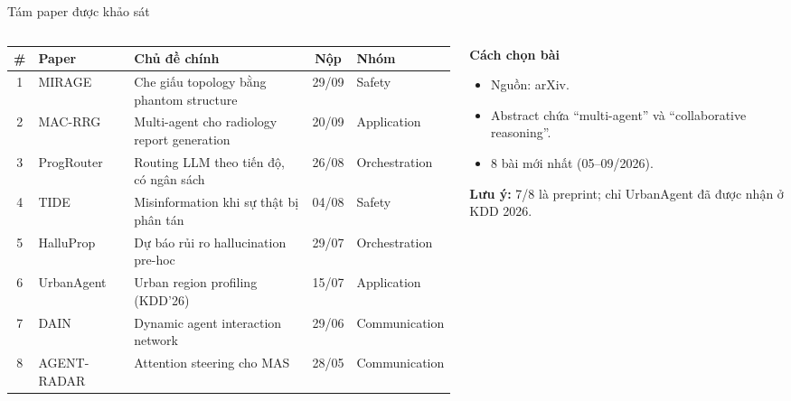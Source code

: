 \documentclass[aspectratio=169,10pt]{beamer}
\begin{document}
\begin{frame}{Tám paper được khảo sát}
  \begin{columns}[T]
    \begin{column}{0.68\textwidth}
      \scriptsize
      \begin{tabular}{@{}c l >{\raggedright\arraybackslash}p{2.9cm} c l@{}}
        \toprule
        \# & Paper & Chủ đề chính & Nộp & Nhóm \\
        \midrule
        1 & MIRAGE      & Che giấu topology bằng phantom structure    & 29/09 & Safety \\
        2 & MAC-RRG     & Multi-agent cho radiology report generation & 20/09 & Application \\
        3 & ProgRouter  & Routing LLM theo tiến độ, có ngân sách      & 26/08 & Orchestration \\
        4 & TIDE        & Misinformation khi sự thật bị phân tán      & 04/08 & Safety \\
        5 & HalluProp   & Dự báo rủi ro hallucination pre-hoc         & 29/07 & Orchestration \\
        6 & UrbanAgent  & Urban region profiling (KDD’26)             & 15/07 & Application \\
        7 & DAIN        & Dynamic agent interaction network           & 29/06 & Communication \\
        8 & AGENT-RADAR & Attention steering cho MAS                  & 28/05 & Communication \\
        \bottomrule
      \end{tabular}
    \end{column}
    \begin{column}{0.28\textwidth}
      \textbf{Cách chọn bài}
      \begin{itemize}
        \item Nguồn: arXiv.
        \item Abstract chứa “multi-agent” và “collaborative reasoning”.
        \item 8 bài mới nhất (05--09/2026).
      \end{itemize}
      \vspace{4pt}
      \textbf{Lưu ý:} 7/8 là preprint; chỉ UrbanAgent đã được nhận ở KDD 2026.
    \end{column}
  \end{columns}
\end{frame}
\end{document}
